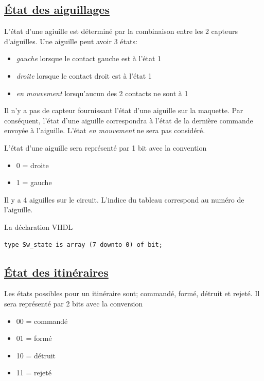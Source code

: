 \subsection{\underline{\'Etat des aiguillages}}
\label{sec:ixl_aig}

L'état d'une agiuille est déterminé par la combinaison entre les 2 capteurs d'aiguilles.
Une aiguille peut avoir 3 états:
\begin{itemize}
\item \emph{gauche} lorsque le contact gauche est à l'état 1
\item \emph{droite} lorsque le contact droit est à l'état 1
\item \emph{en mouvement} lorsqu'aucun des 2 contacts ne sont à 1
\end{itemize}

Il n'y a pas de capteur fournissant l'état d'une aiguille sur la maquette. 
Par conséquent, l'état d'une aiguille correspondra à l'état de la dernière commande envoyée
 à l'aiguille. L'état \emph{en mouvement} ne sera pas considéré.
 
L'état d'une aiguille sera représenté par 1 bit avec la convention 
\begin{itemize}
\item 0 = droite
\item 1 = gauche
\end{itemize}
 
Il y a 4 aiguilles sur le circuit. L'indice du tableau correspond au numéro de l'aiguille.

\medskip
La déclaration VHDL
\begin{lstlisting}[style=vhdl]
  type Sw_state is array (7 downto 0) of bit;  
\end{lstlisting}


\subsection{\underline{\'Etat des itinéraires}}
\label{sec:st_iti}

Les états possibles pour un itinéraire sont; commandé, formé, détruit et rejeté. Il sera représenté
par 2 bits avec la conversion
\begin{itemize} 
\item 00 = commandé
\item 01 = formé
\item 10 = détruit
\item 11 = rejeté
\end{itemize}

